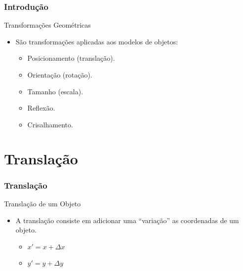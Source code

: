 \documentclass[fleqn]{beamer}
\begin{document}
\begin{frame}
\frametitle{Introdução}


	\begin{block}{Transformações Geométricas}
		\begin{itemize}
			\item São transformações aplicadas aos modelos de objetos:
				\begin{itemize}
					\item Posicionamento (translação).
					\item Orientação (rotação). 
					\item Tamanho (escala).
					\item Reflexão.
					\item Crisalhamento.
				\end{itemize}
		\end{itemize}
	\end{block}
	
\end{frame}

\section{Translação}
\begin{frame}
\frametitle{Translação}


	\begin{block}{Translação de um Objeto}
		\begin{itemize}
			\item A translação consiste em adicionar uma ``variação'' as coordenadas de um objeto.
			\begin{itemize}
				\item $x' = x + \Delta x$
				\item $y' = y + \Delta y$
			\end{itemize}
		\end{itemize}
		
	\end{block}
	
\end{frame}

\end{document}
